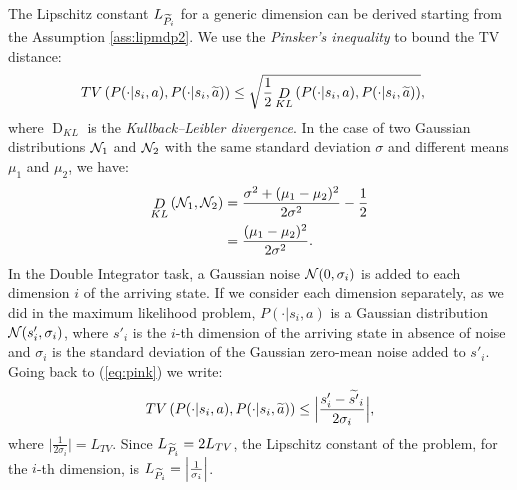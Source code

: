\newline
The Lipschitz constant $L_{\widetilde{P}_{i}}$ for a generic dimension can be derived starting from the Assumption \ref{ass:lipmdp2}. We use the \emph{Pinsker's inequality} to bound the \ac{TV} distance:
\begin{align}
\mathop{TV}\left(P(\cdot|s_{i},a), P(\cdot| s_{i},\widetilde{a})\right) &\leq \sqrt{\frac{1}{2}\mathop{D}_{KL}\left(P(\cdot|s_{i},a), P(\cdot| s_{i},\widetilde{a})\right)}, \label{eq:pink}
\end{align}
where $\mathop{D}_{KL}$ is the \emph{Kullback–Leibler divergence}. In the case of two Gaussian distributions $\mathcal{N}_1$ and $\mathcal{N}_2$ with the same standard deviation $\sigma$ and different means $\mu_1$ and $\mu_2$, we have:
\begin{align}
	\mathop{D}_{KL}\left(\mathcal{N}_1, \mathcal{N}_2\right) &= \frac{\sigma^2 + (\mu_1 - \mu_2)^2}{2\sigma^2} - \frac{1}{2} \nonumber\\
	&= \frac{(\mu_1 - \mu_2)^2}{2\sigma^2}.
\end{align}
In the Double Integrator task, a Gaussian noise $\mathcal{N}(0, \sigma_{i})$ is added to each dimension $i$ of the arriving state. If we consider each dimension separately, as we did in the maximum likelihood problem, $P(\cdot|s_{i},a)$ is a Gaussian distribution $\mathcal{N}(s'_{i}, \sigma_{i})$, where $s'_{i}$ is the $i$-th dimension of the arriving state in absence of noise and $\sigma_{i}$ is the standard deviation of the Gaussian zero-mean noise added to $s'_{i}$. Going back to (\ref{eq:pink}) we write:
\begin{align}
	\mathop{TV}\left(P(\cdot|s_{i},a), P(\cdot| s_{i},\widetilde{a})\right) \leq \Big| \frac{s'_{i} - \widetilde{s'}_{i}}{2\sigma_{i}}\Big|,
\end{align}
where $\Big| \frac{1}{2\sigma_{i}} \Big| = L_{TV}$. Since $L_{\widetilde{P}_{i}}=2L_{TV}$, the Lipschitz constant of the problem, for the $i$-th dimension, is $L_{\widetilde{P}_{i}} = \Big| \frac{1}{\sigma_{i}} \Big|$.
